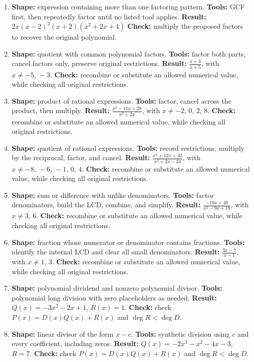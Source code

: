 \documentclass[11pt,oneside]{book}
\begin{document}
\begin{enumerate}[leftmargin=*,label=\textbf{CAP\arabic*.},itemsep=0.45\baselineskip]
\item \textbf{Shape:} expression containing more than one factoring pattern. \textbf{Tools:} GCF first, then repeatedly factor until no listed tool applies. \textbf{Result:} $ 2 x \left(x - 2\right)^{2} \left(x + 2\right) \left(x^{2} + 2 x + 4\right) $ \textbf{Check:} multiply the proposed factors to recover the original polynomial.
\item \textbf{Shape:} quotient with common polynomial factors. \textbf{Tools:} factor both parts, cancel factors only, preserve original restrictions. \textbf{Result:} $\displaystyle \frac{x + 4}{x + 5}$, with $x\ne -5,\,-3$. \textbf{Check:} recombine or substitute an allowed numerical value, while checking all original restrictions.
\item \textbf{Shape:} product of rational expressions. \textbf{Tools:} factor, cancel across the product, then multiply. \textbf{Result:} $\displaystyle \frac{x^{2} - 11 x + 28}{x^{2} + 2 x}$, with $x\ne -2,\,0,\,2,\,8$. \textbf{Check:} recombine or substitute an allowed numerical value, while checking all original restrictions.
\item \textbf{Shape:} quotient of rational expressions. \textbf{Tools:} record restrictions, multiply by the reciprocal, factor, and cancel. \textbf{Result:} $\displaystyle \frac{x^{2} + 12 x + 32}{x^{2} + 2 x - 24}$, with $x\ne -8,\,-6,\,-1,\,0,\,4$. \textbf{Check:} recombine or substitute an allowed numerical value, while checking all original restrictions.
\item \textbf{Shape:} sum or difference with unlike denominators. \textbf{Tools:} factor denominators, build the LCD, combine, and simplify. \textbf{Result:} $\displaystyle \frac{- 10 x + 48}{x^{2} - 9 x + 18}$, with $x\ne 3,\,6$. \textbf{Check:} recombine or substitute an allowed numerical value, while checking all original restrictions.
\item \textbf{Shape:} fraction whose numerator or denominator contains fractions. \textbf{Tools:} identify the internal LCD and clear all small denominators. \textbf{Result:} $\displaystyle \frac{3 x - 7}{x - 1}$, with $x\ne 1,\,3$. \textbf{Check:} recombine or substitute an allowed numerical value, while checking all original restrictions.
\item \textbf{Shape:} polynomial dividend and nonzero polynomial divisor. \textbf{Tools:} polynomial long division with zero placeholders as needed. \textbf{Result:} $Q(x)=- 3 x^{2} - 2 x + 1$, $R(x)=1$. \textbf{Check:} check $P(x)=D(x)Q(x)+R(x)$ and $\deg R<\deg D$.
\item \textbf{Shape:} linear divisor of the form $x-c$. \textbf{Tools:} synthetic division using $c$ and every coefficient, including zeros. \textbf{Result:} $Q(x)=- 2 x^{3} - x^{2} - 4 x - 3$, $R=7$. \textbf{Check:} check $P(x)=D(x)Q(x)+R(x)$ and $\deg R<\deg D$.

\end{enumerate}
\end{document}
